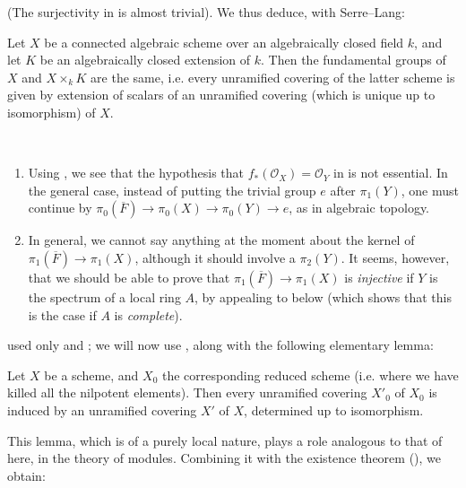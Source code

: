 (The surjectivity in  is almost trivial).
We thus deduce, with Serre–Lang:

\begin{corollary}\label{fga2-theorem-11-corollary-6}
    Let $X$ be a connected algebraic scheme over an algebraically closed field $k$, and let $K$ be an algebraically closed extension of $k$.
    Then the fundamental groups of $X$ and $X\times_kK$ are the same, i.e. every unramified covering of the latter scheme is given by extension of scalars of an unramified covering (which is unique up to isomorphism) of $X$.
\end{corollary}

\begin{remark}\label{fga2-8-remarks-i}
    ~
    \begin{enumerate}
        \item Using , we see that the hypothesis that $f_*(\mathcal{O}_X)=\mathcal{O}_Y$ in  is not essential.
              In the general case, instead of putting the trivial group $e$ after $\pi_1(Y)$, one must continue by $\pi_0(\overline{F})\to\pi_0(X)\to\pi_0(Y)\to e$,
              as in algebraic topology.
        \item In general, we cannot say anything at the moment about the kernel of $\pi_1(\overline{F})\to\pi_1(X)$, although it should involve a $\pi_2(Y)$.
              It seems, however, that we should be able to prove that $\pi_1(\overline{F})\to\pi_1(X)$ is \emph{injective} if $Y$ is the spectrum of a local ring $A$, by appealing to  below (which shows that this is the case if $A$ is \emph{complete}).
    \end{enumerate}
\end{remark}

 used only  and ;
we will now use , along with the following elementary lemma:

\begin{lemma}\label{fga2-lemma-6}
    Let $X$ be a scheme, and $X_0$ the corresponding reduced scheme (i.e. where we have killed all the nilpotent elements).
    Then every unramified covering $X'_0$ of $X_0$ is induced by an unramified covering $X'$ of $X$, determined up to isomorphism.
\end{lemma}

This lemma, which is of a purely local nature, plays a role analogous to that of  here, in the theory of modules.
Combining it with the existence theorem (), we obtain:

